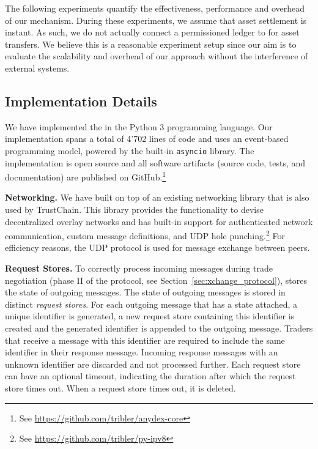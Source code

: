 The following experiments quantify the effectiveness, performance and overhead of our \ModelName{} mechanism.
During these experiments, we assume that asset settlement is instant.
As such, we do not actually connect a permissioned ledger to \ModelName{} for asset transfers.
We believe this is a reasonable experiment setup since our aim is to evaluate the scalability and overhead of our approach without the interference of external systems.

\subsection{Implementation Details}
\label{sec:implementation}
We have implemented the \ModelName{} in the Python 3 programming language.
Our implementation spans a total of 4'702 lines of code and uses an event-based programming model, powered by the built-in \texttt{asyncio} library.
The implementation is open source and all software artifacts (source code, tests, and documentation) are published on GitHub.\footnote{See \url{https://github.com/tribler/anydex-core}}

\textbf{Networking.}
We have built \ModelName{} on top of an existing networking library that is also used by TrustChain.
This library provides the functionality to devise decentralized overlay networks and has built-in support for authenticated network communication, custom message definitions, and UDP hole punching.\footnote{See \url{https://github.com/tribler/py-ipv8}}
For efficiency reasons, the UDP protocol is used for message exchange between peers.

\textbf{Request Stores.}
To correctly process incoming messages during trade negotiation (phase II of the \ModelName{} protocol, see Section~\ref{sec:xchange_protocol}), \ModelName{} stores the state of outgoing messages.
The state of outgoing messages is stored in distinct \emph{request stores}.
For each outgoing message that has a state attached, a unique identifier is generated, a new request store containing this identifier is created and the generated identifier is appended to the outgoing message.
Traders that receive a message with this identifier are required to include the same identifier in their response message.
Incoming response messages with an unknown identifier are discarded and not processed further.
Each request store can have an optional timeout, indicating the duration after which the request store times out.
When a request store times out, it is deleted.


